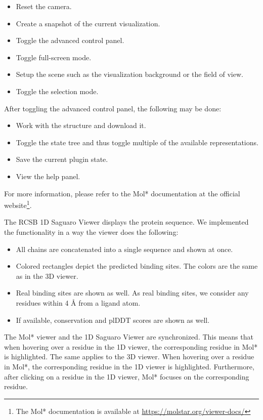 \begin{itemize}
    \item Reset the camera.
    \item Create a snapshot of the current visualization.
    \item Toggle the advanced control panel.
    \item Toggle full-screen mode.
    \item Setup the scene such as the visualization background or the field of view.
    \item Toggle the selection mode.
\end{itemize}

After toggling the advanced control panel, the following may be done:

\begin{itemize}
    \item Work with the structure and download it.
    \item Toggle the state tree and thus toggle multiple of the available representations.
    \item Save the current plugin state.
    \item View the help panel.
\end{itemize}

For more information, please refer to the Mol* documentation at the official website\footnote{The Mol* documentation is available at \url{https://molstar.org/viewer-docs/}}.

The RCSB 1D Saguaro Viewer displays the protein sequence. We implemented the functionality in a way the viewer does the following:

\begin{itemize}
    \item All chains are concatenated into a single sequence and shown at once.
    \item Colored rectangles depict the predicted binding sites. The colors are the same as in the 3D viewer.
    \item Real binding sites are shown as well. As real binding sites, we consider any residues within 4 \AA{} from a ligand atom.
    \item If available, conservation and plDDT scores are shown as well.
\end{itemize}

The Mol* viewer and the 1D Saguaro Viewer are synchronized. This means that when hovering over a residue in the 1D viewer, the corresponding residue in Mol* is highlighted. The same applies to the 3D viewer. When hovering over a residue in Mol*, the corresponding residue in the 1D viewer is highlighted. Furthermore, after clicking on a residue in the 1D viewer, Mol* focuses on the corresponding residue.

